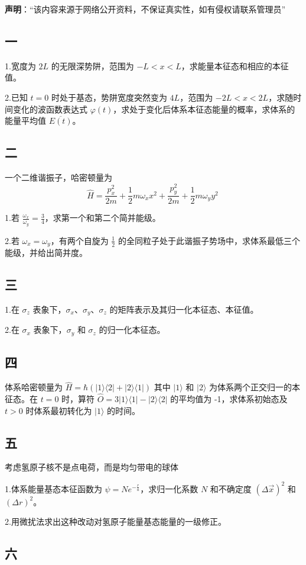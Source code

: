 
\textbf{声明}：“该内容来源于网络公开资料，不保证真实性，如有侵权请联系管理员”

\subsection{一}
1.宽度为 $2L$ 的无限深势阱，范围为 $-L < x < L$，求能量本征态和相应的本征值。

2.已知 $t = 0$ 时处于基态，势阱宽度突然变为 $4L$，范围为 $-2L < x < 2L$，求随时间变化的波函数表达式 $\varphi(t)$，求处于变化后体系本征态能量的概率，求体系的能量平均值 $\overline{E(t)}$。
\subsection{二}
一个二维谐振子，哈密顿量为
$$\hat{H} = \frac{p_x^2}{2m} + \frac{1}{2} m \omega_x x^2 + \frac{p_y^2}{2m} + \frac{1}{2} m \omega_y y^2~$$

1.若 $\frac{\omega_x}{\omega_y} = \frac{3}{4}$，求第一个和第二个简并能级。

2.若 $\omega_x = \omega_y$，有两个自旋为 $\frac{1}{2}$ 的全同粒子处于此谐振子势场中，求体系最低三个能级，并给出简并度。
\subsection{三}
1.在 $\sigma_z$ 表象下，$\sigma_x$、$\sigma_y$、$\sigma_z$ 的矩阵表示及其归一化本征态、本征值。

2.在 $\sigma_x$ 表象下，$\sigma_y$ 和 $\sigma_z$ 的归一化本征态。
\subsection{四}
体系哈密顿量为
$\hat{H} = \hbar( |1\rangle \langle 2| + |2\rangle \langle 1| )$
其中 $|1\rangle$ 和 $|2\rangle$ 为体系两个正交归一的本征态。在 $t=0$ 时，算符
$\hat{O} = 3 |1\rangle \langle 1| - |2\rangle \langle 2|$
的平均值为 -1，求体系初始态及 $t > 0$ 时体系最初转化为 $|1\rangle$ 的时间。
\subsection{五}
考虑氢原子核不是点电荷，而是均匀带电的球体

1.体系能量基态本征函数为 $\psi = N e^{-\frac{r}{a}}$，求归一化系数 $N$ 和不确定度 $(\Delta \vec x)^2$ 和 $(\Delta r)^2$。

2.用微扰法求出这种改动对氢原子能量基态能量的一级修正。
\subsection{六}
